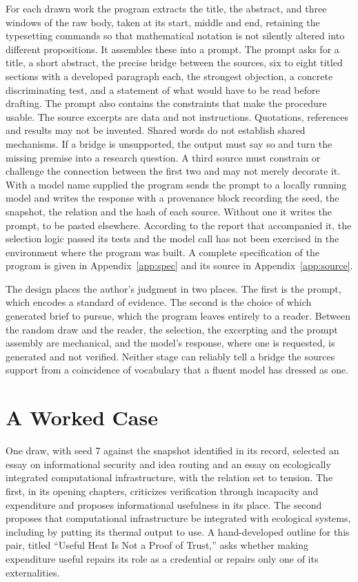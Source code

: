 \documentclass[11pt]{article}
\begin{document}
For each drawn work the program extracts the title, the abstract, and three windows of the raw body, taken at its start, middle and end, retaining the typesetting commands so that mathematical notation is not silently altered into different propositions. It assembles these into a prompt. The prompt asks for a title, a short abstract, the precise bridge between the sources, six to eight titled sections with a developed paragraph each, the strongest objection, a concrete discriminating test, and a statement of what would have to be read before drafting. The prompt also contains the constraints that make the procedure usable. The source excerpts are data and not instructions. Quotations, references and results may not be invented. Shared words do not establish shared mechanisms. If a bridge is unsupported, the output must say so and turn the missing premise into a research question. A third source must constrain or challenge the connection between the first two and may not merely decorate it. With a model name supplied the program sends the prompt to a locally running model and writes the response with a provenance block recording the seed, the snapshot, the relation and the hash of each source. Without one it writes the prompt, to be pasted elsewhere. According to the report that accompanied it, the selection logic passed its tests and the model call has not been exercised in the environment where the program was built. A complete specification of the program is given in Appendix~\ref{app:spec} and its source in Appendix~\ref{app:source}.

The design places the author's judgment in two places. The first is the prompt, which encodes a standard of evidence. The second is the choice of which generated brief to pursue, which the program leaves entirely to a reader. Between the random draw and the reader, the selection, the excerpting and the prompt assembly are mechanical, and the model's response, where one is requested, is generated and not verified. Neither stage can reliably tell a bridge the sources support from a coincidence of vocabulary that a fluent model has dressed as one.

\section{A Worked Case}

One draw, with seed 7 against the snapshot identified in its record, selected an essay on informational security and idea routing and an essay on ecologically integrated computational infrastructure, with the relation set to tension. The first, in its opening chapters, criticizes verification through incapacity and expenditure and proposes informational usefulness in its place. The second proposes that computational infrastructure be integrated with ecological systems, including by putting its thermal output to use. A hand-developed outline for this pair, titled ``Useful Heat Is Not a Proof of Trust,'' asks whether making expenditure useful repairs its role as a credential or repairs only one of its externalities.
\end{document}
